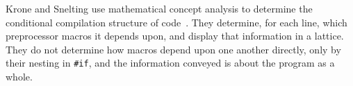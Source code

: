\documentclass[11pt]{article}
\begin{document}

Krone and Snelting use mathematical concept analysis to determine the
conditional compilation structure of code~\cite{Krone94}.  They determine,
for each line, which preprocessor macros it depends upon, and display that
information in a lattice.  They do not determine how macros depend upon one
another directly, only by their nesting in {\tt \#if}, and the information
conveyed is about the program as a whole.


{\small }
\end{document}
